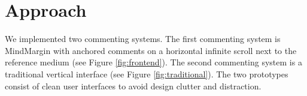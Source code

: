 \section {Approach}


We implemented two commenting systems. The first commenting system is MindMargin with anchored comments on a horizontal infinite scroll next to the reference medium (see Figure \ref{fig:frontend}). The second commenting system is a traditional vertical interface (see Figure \ref{fig:traditional}). The two prototypes consist of clean user interfaces to avoid design clutter and distraction. 

